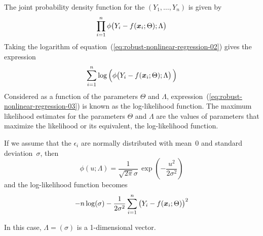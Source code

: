 \documentclass{admbmanual}
\begin{document}
The joint probability density function for the $(Y_1,\ldots,Y_n)$ is given by
\begin{equation}
  \label{eq:robust-nonlinear-regression-02} %
  \prod_{i=1}^n \phi\big(Y_i-f({\mbox{\boldmath $x$}}_i;\Theta);\Lambda\big)
\end{equation}
Taking the logarithm of
equation~(\ref{eq:robust-nonlinear-regression-02}) %
gives the expression
\begin{equation}
  \label{eq:robust-nonlinear-regression-03} %
  \sum_{i=1}^n \log
  \Big(\phi\big(Y_i-f({\mbox{\boldmath $x$}}_i;\Theta);\Lambda\big)\,\Big)
\end{equation}
Considered as a function of the parameters $\Theta$ and $\Lambda$,
expression~(\ref{eq:robust-nonlinear-regression-03}) %
is known as the log-likelihood function. The maximum likelihood estimates for
the parameters $\Theta$ and $\Lambda$ are the values of parameters that maximize
the likelihood or its equivalent, the log-likelihood function.

If we assume that the $\epsilon_i$ are normally distributed with mean~$0$ and
standard deviation~$\sigma$, then
\begin{equation*}
  \phi(u;\Lambda)= \frac{1}{\sqrt{2\pi}\sigma}
    \,\exp\left(-\frac{u^2}{2\sigma^2}\right)
\end{equation*}
and the log-likelihood function becomes
\begin{equation}
  \label{eq:robust-nonlinear-regression-04} %
  -n\log(\sigma)-\frac{1}{2\sigma^2}
  \sum_{i=1}^n\big(Y_i-f({\mbox{\boldmath $x$}}_i;\Theta)\big)^2
\end{equation}

In this case, $\Lambda=(\sigma)$ is a 1-dimensional vector.
\end{document}
